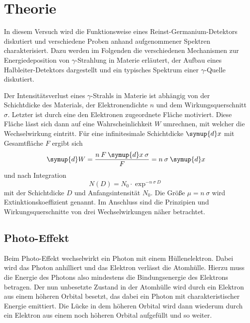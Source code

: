 \section{Theorie}
\label{sec:Theorie}

In diesem Versuch wird die Funktionsweise eines Reinst-Germanium-Detektors diskutiert
und verschiedene Proben anhand aufgenommener Spektren charakterisiert.
Dazu werden im Folgenden die verschiedenen Mechanismen zur Energiedeposition von
$\gamma$-Strahlung in Materie erläutert, der Aufbau eines Halbleiter-Detektors
dargestellt und ein typisches Spektrum einer $\gamma$-Quelle diskutiert.

Der Intensitätsverlust eines $\gamma$-Strahls in Materie ist abhängig von
der Schichtdicke des Materials, der Elektronendichte $n$ und dem
Wirkungsquerschnitt $\sigma$.
Letzter ist durch eine den Elektronen zugeordnete Fläche motiviert.
Diese Fläche lässt sich dann auf eine Wahrscheinlichkeit $W$ umrechnen,
mit welcher die Wechselwirkung eintritt. Für eine infinitesimale Schichtdicke
$\symup{d}x$ mit Gesamtfläche $F$ ergibt sich
\begin{equation*}
	\symup{d}W = \frac{n\:F\:\symup{d}x\:\sigma}{F} = n\:\sigma\:\symup{d}x
\end{equation*}
und nach Integration
\begin{equation}
	N\left(D\right) = N_\text{0} \cdot \exp^{-n\:\sigma\:D}
	\label{eqn:Intensitaet-Exp}
\end{equation}
mit der Schichtdicke $D$ und Anfangsintensität $N_\text{0}$.
Die Größe $\mu = n\:\sigma$ wird Extinktionskoeffizient genannt.
Im Anschluss sind die Prinzipien und Wirkungsquerschnitte von drei
Wechselwirkungen näher betrachtet.

\subsection{Photo-Effekt}
\label{sec:Photo-Effekt}

Beim Photo-Effekt wechselwirkt ein Photon mit einem Hüllenelektron. Dabei
wird das Photon anhilliert und das Elektron verlässt die Atomhülle.
Hierzu muss die Energie des Photons also mindestens die Bindungsenergie des
Elektrons betragen.
Der nun unbesetzte Zustand in der Atomhülle wird durch ein Elektron aus
einem höheren Orbital besetzt, das dabei ein Photon mit charakteristischer
Energie emittiert. Die Lücke in dem höheren Orbital wird dann wiederum durch
ein Elektron aus einem noch höheren Orbital aufgefüllt und so weiter.

